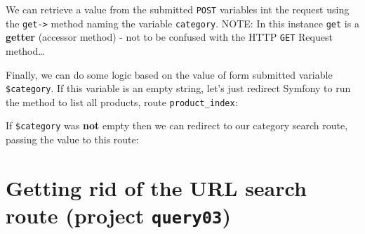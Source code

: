 \documentclass[a4paperpaper,openright]{book}
\newenvironment{Shaded}{}{}
\newcommand{\KeywordTok}[1]{\textcolor[rgb]{0.00,0.44,0.13}{\textbf{#1}}}
\newcommand{\NormalTok}[1]{#1}
\newcommand{\OtherTok}[1]{\textcolor[rgb]{0.00,0.44,0.13}{#1}}
\newcommand{\StringTok}[1]{\textcolor[rgb]{0.25,0.44,0.63}{#1}}
\begin{document}
We can retrieve a value from the submitted \texttt{POST} variables int
the request using the \texttt{get-\textgreater{}} method naming the
variable \texttt{category}. NOTE: In this instance \texttt{get} is a
\textbf{getter} (accessor method) - not to be confused with the HTTP
\texttt{GET} Request method\ldots{}

\begin{Shaded}
\end{Shaded}

Finally, we can do some logic based on the value of form submitted
variable \texttt{\$category}. If this variable is an empty string, let's
just redirect Symfony to run the method to list all products, route
\texttt{product\_index}:

\begin{Shaded}
\end{Shaded}

If \texttt{\$category} was \textbf{not} empty then we can redirect to
our category search route, passing the value to this route:

\begin{Shaded}
\end{Shaded}

\hypertarget{getting-rid-of-the-url-search-route-project-query03}{%
\section{\texorpdfstring{Getting rid of the URL search route (project
\texttt{query03})}{Getting rid of the URL search route (project query03)}}\label{getting-rid-of-the-url-search-route-project-query03}}
\end{document}
